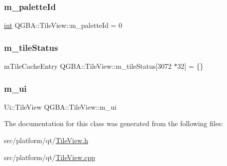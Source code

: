 \subsubsection{\texorpdfstring{m\+\_\+palette\+Id}{m\_paletteId}}
{\footnotesize\ttfamily \mbox{\hyperlink{ioapi_8h_a787fa3cf048117ba7123753c1e74fcd6}{int}} Q\+G\+B\+A\+::\+Tile\+View\+::m\+\_\+palette\+Id = 0\hspace{0.3cm}{\ttfamily [private]}}

\mbox{\label{class_q_g_b_a_1_1_tile_view_a56211cc11156c156d156f11f1395ba9e}} 
\subsubsection{\texorpdfstring{m\+\_\+tile\+Status}{m\_tileStatus}}
{\footnotesize\ttfamily m\+Tile\+Cache\+Entry Q\+G\+B\+A\+::\+Tile\+View\+::m\+\_\+tile\+Status\mbox{[}3072 $\ast$32\mbox{]} = \{\}\hspace{0.3cm}{\ttfamily [private]}}

\mbox{\label{class_q_g_b_a_1_1_tile_view_a39583b2b32b232918e23c63deb5f2113}} 
\subsubsection{\texorpdfstring{m\+\_\+ui}{m\_ui}}
{\footnotesize\ttfamily Ui\+::\+Tile\+View Q\+G\+B\+A\+::\+Tile\+View\+::m\+\_\+ui\hspace{0.3cm}{\ttfamily [private]}}



The documentation for this class was generated from the following files\+:\begin{DoxyCompactItemize}
\item 
src/platform/qt/\mbox{\hyperlink{_tile_view_8h}{Tile\+View.\+h}}\item 
src/platform/qt/\mbox{\hyperlink{_tile_view_8cpp}{Tile\+View.\+cpp}}\end{DoxyCompactItemize}
